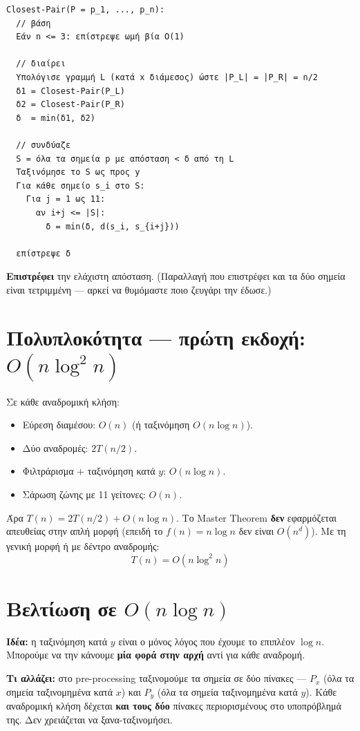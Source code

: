 \documentclass[11pt,a4paper]{article}
\begin{document}
\begin{codebox}
\begin{verbatim}
Closest-Pair(P = p_1, ..., p_n):
  // βάση
  Εάν n <= 3: επίστρεψε ωμή βία O(1)

  // διαίρει
  Υπολόγισε γραμμή L (κατά x διάμεσος) ώστε |P_L| = |P_R| = n/2
  δ1 = Closest-Pair(P_L)
  δ2 = Closest-Pair(P_R)
  δ  = min(δ1, δ2)

  // συνδύαζε
  S = όλα τα σημεία p με απόσταση < δ από τη L
  Ταξινόμησε το S ως προς y
  Για κάθε σημείο s_i στο S:
    Για j = 1 ως 11:
      αν i+j <= |S|:
        δ = min(δ, d(s_i, s_{i+j}))

  επίστρεψε δ
\end{verbatim}
\end{codebox}
\textbf{Επιστρέφει} την ελάχιστη απόσταση. (Παραλλαγή που επιστρέφει και τα δύο
σημεία είναι τετριμμένη --- αρκεί να θυμόμαστε ποιο ζευγάρι την έδωσε.)

\section{Πολυπλοκότητα --- πρώτη εκδοχή: $O(n \log^2 n)$}

Σε κάθε αναδρομική κλήση:
\begin{itemize}
  \item Εύρεση διαμέσου: $O(n)$ (ή ταξινόμηση $O(n \log n)$).
  \item Δύο αναδρομές: $2 T(n/2)$.
  \item Φιλτράρισμα $+$ ταξινόμηση κατά $y$: $O(n \log n)$.
  \item Σάρωση ζώνης με 11 γείτονες: $O(n)$.
\end{itemize}
Άρα $T(n) = 2 T(n/2) + O(n \log n)$. Το Master Theorem \textbf{δεν} εφαρμόζεται
απευθείας στην απλή μορφή (επειδή το $f(n) = n \log n$ δεν είναι $O(n^d)$). Με τη
γενική μορφή ή με δέντρο αναδρομής:
\[
T(n) = O(n \log^2 n)
\]

\section{Βελτίωση σε $O(n \log n)$}

\textbf{Ιδέα:} η ταξινόμηση κατά $y$ είναι ο μόνος λόγος που έχουμε το επιπλέον
$\log n$. Μπορούμε να την κάνουμε \textbf{μία φορά στην αρχή} αντί για κάθε
αναδρομή.

\textbf{Τι αλλάζει:} στο pre-processing ταξινομούμε τα σημεία σε δύο πίνακες ---
$P_x$ (όλα τα σημεία ταξινομημένα κατά $x$) και $P_y$ (όλα τα σημεία
ταξινομημένα κατά $y$). Κάθε αναδρομική κλήση δέχεται \textbf{και τους δύο}
πίνακες περιορισμένους στο υποπρόβλημά της. Δεν χρειάζεται να ξανα-ταξινομήσει.
\end{document}
